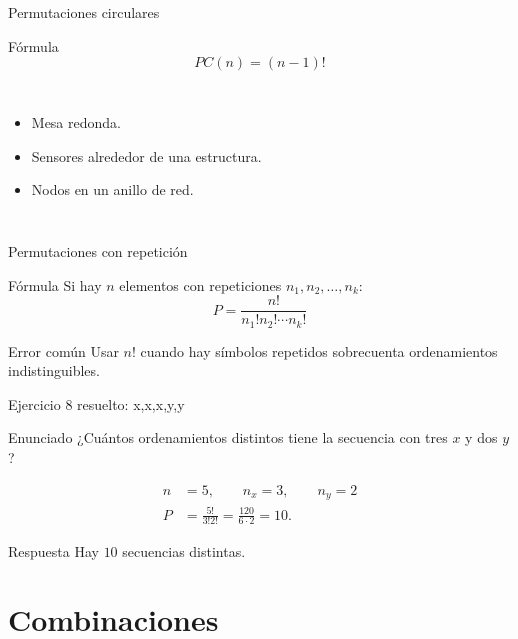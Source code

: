 \documentclass[aspectratio=169,11pt]{beamer}
\begin{document}
\begin{frame}{Permutaciones circulares}
\begin{block}{Fórmula}
\[
PC(n)=(n-1)!
\]
\end{block}
\begin{columns}[T]
\begin{itemize}
  \item Mesa redonda.
  \item Sensores alrededor de una estructura.
  \item Nodos en un anillo de red.
\end{itemize}
\end{columns}
\end{frame}

\begin{frame}{Permutaciones con repetición}
\begin{block}{Fórmula}
Si hay $n$ elementos con repeticiones $n_1,n_2,\ldots,n_k$:
\[
P=\frac{n!}{n_1!n_2!\cdots n_k!}
\]
\end{block}
\begin{alertblock}{Error común}
Usar $n!$ cuando hay símbolos repetidos sobrecuenta ordenamientos indistinguibles.
\end{alertblock}
\end{frame}

\begin{frame}{Ejercicio 8 resuelto: x,x,x,y,y}
\begin{block}{Enunciado}
¿Cuántos ordenamientos distintos tiene la secuencia con tres $x$ y dos $y$?
\end{block}
\pause
\begin{align*}
n&=5,\qquad n_x=3,\qquad n_y=2\\
P&=\frac{5!}{3!2!}=\frac{120}{6\cdot2}=10.
\end{align*}
\begin{exampleblock}{Respuesta}
Hay $10$ secuencias distintas.
\end{exampleblock}
\end{frame}

\section{Combinaciones}
\end{document}
